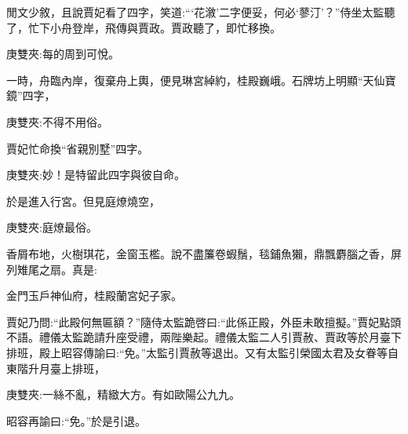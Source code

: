 \begin{parag}
    閒文少敘，且說賈妃看了四字，笑道:“‘花漵’二字便妥，何必‘蓼汀’？”侍坐太監聽了，忙下小舟登岸，飛傳與賈政。賈政聽了，即忙移換。\begin{note}庚雙夾:每的周到可悅。\end{note}一時，舟臨內岸，復棄舟上輿，便見琳宮綽約，桂殿巍峨。石牌坊上明顯“天仙寶鏡”四字，\begin{note}庚雙夾:不得不用俗。\end{note}賈妃忙命換“省親別墅”四字。\begin{note}庚雙夾:妙！是特留此四字與彼自命。\end{note}於是進入行宮。但見庭燎燒空，\begin{note}庚雙夾:庭燎最俗。\end{note}香屑布地，火樹琪花，金窗玉檻。說不盡簾卷蝦鬚，毯鋪魚獺，鼎飄麝腦之香，屏列雉尾之扇。真是:
\end{parag}


\begin{poem}
    \begin{pl}金門玉戶神仙府，桂殿蘭宮妃子家。\end{pl}
\end{poem}


\begin{parag}
    賈妃乃問:“此殿何無匾額？”隨侍太監跪啓曰:“此係正殿，外臣未敢擅擬。”賈妃點頭不語。禮儀太監跪請升座受禮，兩陛樂起。禮儀太監二人引賈赦、賈政等於月臺下排班，殿上昭容傳諭曰:“免。”太監引賈赦等退出。又有太監引榮國太君及女眷等自東階升月臺上排班，\begin{note}庚雙夾:一絲不亂，精緻大方。有如歐陽公九九。\end{note}昭容再諭曰:“免。”於是引退。
\end{parag}


